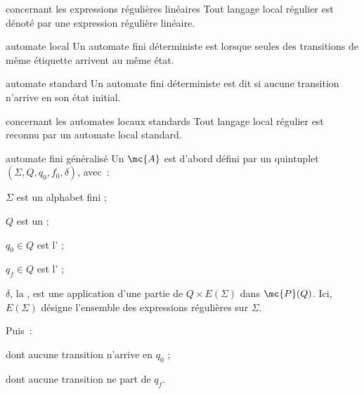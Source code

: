 \begin{adjustwidth}{-3cm}{-3cm}
\begin{proposition}{2.14}{concernant les expressions régulières linéaires}
    Tout langage local régulier est dénoté par une expression régulière linéaire.
\end{proposition}

\begin{definition}{2.15}{automate local}
    Un automate fini déterministe est  lorsque seules des transitions de même étiquette arrivent au même état.
\end{definition}

\begin{definition}{2.16}{automate standard}
    Un automate fini déterministe est dit  si aucune transition n'arrive en son état initial.
\end{definition}

\begin{proposition}{2.17}{concernant les automates locaux standards}
    Tout langage local régulier est reconnu par un automate local standard.
\end{proposition}

\begin{definition}{2.18}{automate fini généralisé}
    Un  ${\mc{A}}$ est d'abord défini par un quintuplet $(\Sigma, Q, q_0, f_0, \delta)$, avec~:
    \begin{enumeratebf}
        \item $\Sigma$ est un alphabet fini ;
        \item $Q$ est un  ;
        \item $q_0 \in Q$ est l' ;
        \item $q_f \in Q$ est l' ;
        \item $\delta$, la , est une application d'une partie de $Q \times E(\Sigma)$ dans $\mc{P}(Q)$. Ici, $E(\Sigma)$ désigne l'ensemble des expressions régulières sur $\Sigma$.
    \end{enumeratebf}
    Puis~:
    \begin{enumeratebf}
        \item dont aucune transition n'arrive en $q_0$ ;
        \item dont aucune transition ne part de $q_f$.
    \end{enumeratebf}
\end{definition}


\end{adjustwidth}

